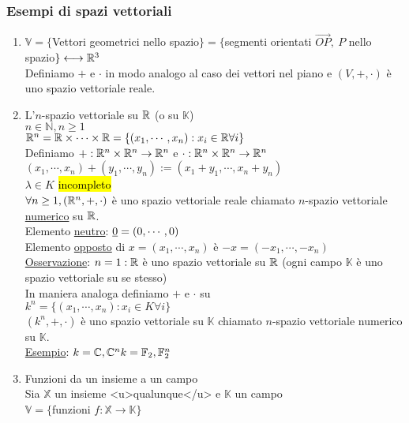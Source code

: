 \documentclass{article}
\begin{document}
\subsubsection*{Esempi di spazi vettoriali}
\begin{enumerate}
	\item $\mathbb{V}=\{$Vettori geometrici nello spazio$\}=\{$segmenti orientati $\vec{OP},\ P$ nello spazio$\}\longleftrightarrow\mathbb{R}^3$\\
	      Definiamo $+$ e $\cdot$ in modo analogo al caso dei vettori nel piano e $(V,+,\cdot)$ è uno spazio vettoriale reale.
	\item L'$n$-spazio vettoriale su $\mathbb{R}$ (o su $\mathbb{K}$)\\
	      $n\in\mathbb{N},n\ge1$\\
	      $\mathbb{R}^n=\mathbb{R}\times\cdots\times\mathbb{R}=\{(x_1,\cdots,x_n):x_i\in\mathbb{R}\forall i\}$\\
	      Definiamo $+:\mathbb{R}^n\times\mathbb{R}^n\to\mathbb{R}^n$ e $\cdot:\mathbb{R}^n\times\mathbb{R}^n\to\mathbb{R}^n$\\
	      $(x_1,\cdots,x_n)+(y_1,\cdots,y_n):=(x_1+y_1,\cdots,x_n+y_n)$\\
	      $\lambda\in K$ \hl{incompleto}\\
	      $\forall n\ge1,(\mathbb{R}^n,+,\cdot)$ è uno spazio vettoriale reale chiamato $n$-spazio vettoriale \ul{numerico} su $\mathbb{R}$.\\
	      Elemento \ul{neutro}: $\underline{0}=(0,\cdots,0)$\\
	      Elemento \ul{opposto} di $x=(x_1,\cdots,x_n)$ è $-x=(-x_1,\cdots,-x_n)$\\
	      \ul{Osservazione}: $n=1:\mathbb{R}$ è uno spazio vettoriale su $\mathbb{R}$ (ogni campo $\mathbb{K}$ è uno spazio vettoriale su se stesso)\\
	      In maniera analoga definiamo $+$ e $\cdot$ su\\
	      $k^n=\{(x_1,\cdots,x_n):x_i\in K\forall i\}$\\
	      $(k^n,+,\cdot)$ è uno spazio vettoriale su $\mathbb{K}$ chiamato $n$-spazio vettoriale numerico su $\mathbb{K}$.\\
	      \ul{Esempio}: $k=\mathbb{C},\mathbb{C}^n\\k=\mathbb{F}_2,\mathbb{F}^n_2$
	\item Funzioni da un insieme a un campo\\
	      Sia $\mathbb{X}$ un insieme <u>qualunque</u> e $\mathbb{K}$ un campo\\
	      $\mathbb{V}=\{$funzioni $f:\mathbb{X}\to\mathbb{K}\}$
	      \begin{itemize}

\end{itemize}
\end{enumerate}
\end{document}
